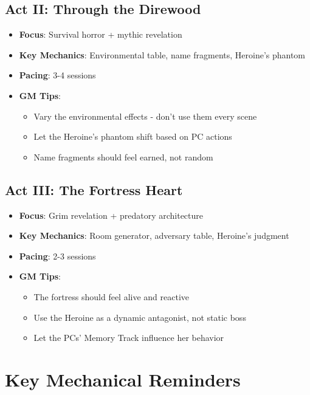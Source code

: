 \documentclass[11pt]{article}
\begin{document}
\subsection{Act II: Through the Direwood}
\begin{itemize}
    \item \textbf{Focus}: Survival horror + mythic revelation
    \item \textbf{Key Mechanics}: Environmental table, name fragments, Heroine's phantom
    \item \textbf{Pacing}: 3-4 sessions
    \item \textbf{GM Tips}:
        \begin{itemize}
            \item Vary the environmental effects - don't use them every scene
            \item Let the Heroine's phantom shift based on PC actions
            \item Name fragments should feel earned, not random
        \end{itemize}
\end{itemize}

\subsection{Act III: The Fortress Heart}
\begin{itemize}
    \item \textbf{Focus}: Grim revelation + predatory architecture
    \item \textbf{Key Mechanics}: Room generator, adversary table, Heroine's judgment
    \item \textbf{Pacing}: 2-3 sessions
    \item \textbf{GM Tips}:
        \begin{itemize}
            \item The fortress should feel alive and reactive
            \item Use the Heroine as a dynamic antagonist, not static boss
            \item Let the PCs' Memory Track influence her behavior
        \end{itemize}
\end{itemize}

\section{Key Mechanical Reminders}
\end{document}
